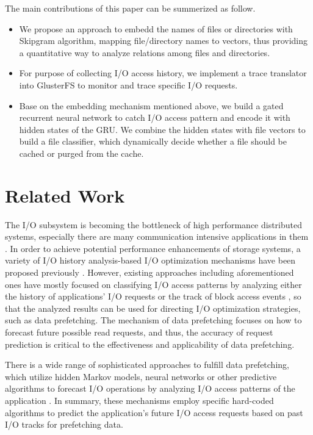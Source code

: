 \documentclass[conference]{IEEEtran}
\begin{document}
The main contributions of this paper can be summerized as follow.
\begin{itemize}
    \item We propose an approach to embedd the names of files or directories with Skipgram algorithm, 
    mapping file/directory names to vectors, thus providing a quantitative way to analyze relations among files and directories.
    \item For purpose of collecting I/O access history, we implement a trace translator into GlusterFS to monitor and trace specific I/O requests.
    \item Base on the embedding mechanism mentioned above, we build a gated recurrent neural network to catch I/O access pattern and encode it with hidden states of the GRU.
    We combine the hidden states with file vectors to build a file classifier, which dynamically decide whether a file should be cached or purged from the cache.

\end{itemize}

\section{Related Work}
The I/O subsystem is becoming the bottleneck of high performance distributed systems, 
especially there are many communication intensive applications in them \cite{Related_Network_I/O_load_based}.
In order to achieve potential performance enhancements of storage systems, 
a variety of I/O history analysis-based I/O optimization mechanisms have been proposed previously 
\cite{Related_Multi_Layer_Event_Trace_Analysis} \cite{Related_Towards_an_I/O_tracing_framework_taxonomy} \cite{Related_DiskSeen} \cite{A_Prefetching_Scheme_Related} \cite{Scalable_IO_Tracing_Related}.
However, existing approaches including aforementioned ones have mostly focused on classifying I/O access patterns by analyzing either the history of applications’ I/O requests
\cite{Parallel_IO_Prefetching_Related} \cite{Learning_To_Classify_Related}
or the track of block access events \cite{Related_DiskSeen} \cite{A_Prefetching_Scheme_Related}, 
so that the analyzed results can be used for directing I/O optimization strategies, such as data prefetching.
The mechanism of data prefetching focuses on how to forecast future possible read requests, and thus, 
the accuracy of request prediction is critical to the effectiveness and applicability of data prefetching.

There is a wide range of sophisticated approaches to fulﬁll data prefetching, 
which utilize hidden Markov models, 
neural networks or other predictive algorithms to forecast I/O operations by analyzing I/O access patterns of the application 
\cite{Parallel_IO_Prefetching_Related} \cite{IO_Acceleration_with_Related} \cite{An_Automatic_Prefetching_Related} \cite{Reducing_File_System_Latency_Related} \cite{Automatic_ARIMA_Related}.
In summary, these mechanisms employ specific hard-coded algorithms to predict the application's future I/O access requests based on past I/O tracks for prefetching data.
\end{document}
